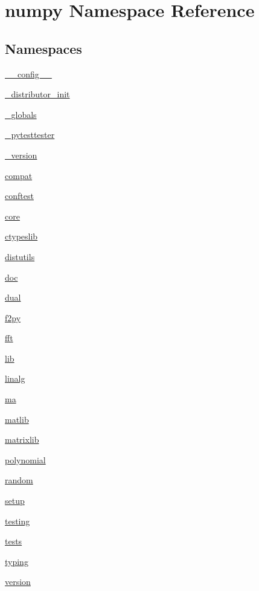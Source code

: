 \hypertarget{namespacenumpy}{}\section{numpy Namespace Reference}
\label{namespacenumpy}
\subsection*{Namespaces}
\begin{DoxyCompactItemize}
\item 
 \hyperlink{namespacenumpy_1_1____config____}{\+\_\+\+\_\+config\+\_\+\+\_\+}
\item 
 \hyperlink{namespacenumpy_1_1__distributor__init}{\+\_\+distributor\+\_\+init}
\item 
 \hyperlink{namespacenumpy_1_1__globals}{\+\_\+globals}
\item 
 \hyperlink{namespacenumpy_1_1__pytesttester}{\+\_\+pytesttester}
\item 
 \hyperlink{namespacenumpy_1_1__version}{\+\_\+version}
\item 
 \hyperlink{namespacenumpy_1_1compat}{compat}
\item 
 \hyperlink{namespacenumpy_1_1conftest}{conftest}
\item 
 \hyperlink{namespacenumpy_1_1core}{core}
\item 
 \hyperlink{namespacenumpy_1_1ctypeslib}{ctypeslib}
\item 
 \hyperlink{namespacenumpy_1_1distutils}{distutils}
\item 
 \hyperlink{namespacenumpy_1_1doc}{doc}
\item 
 \hyperlink{namespacenumpy_1_1dual}{dual}
\item 
 \hyperlink{namespacenumpy_1_1f2py}{f2py}
\item 
 \hyperlink{namespacenumpy_1_1fft}{fft}
\item 
 \hyperlink{namespacenumpy_1_1lib}{lib}
\item 
 \hyperlink{namespacenumpy_1_1linalg}{linalg}
\item 
 \hyperlink{namespacenumpy_1_1ma}{ma}
\item 
 \hyperlink{namespacenumpy_1_1matlib}{matlib}
\item 
 \hyperlink{namespacenumpy_1_1matrixlib}{matrixlib}
\item 
 \hyperlink{namespacenumpy_1_1polynomial}{polynomial}
\item 
 \hyperlink{namespacenumpy_1_1random}{random}
\item 
 \hyperlink{namespacenumpy_1_1setup}{setup}
\item 
 \hyperlink{namespacenumpy_1_1testing}{testing}
\item 
 \hyperlink{namespacenumpy_1_1tests}{tests}
\item 
 \hyperlink{namespacenumpy_1_1typing}{typing}
\item 
 \hyperlink{namespacenumpy_1_1version}{version}
\end{DoxyCompactItemize}
